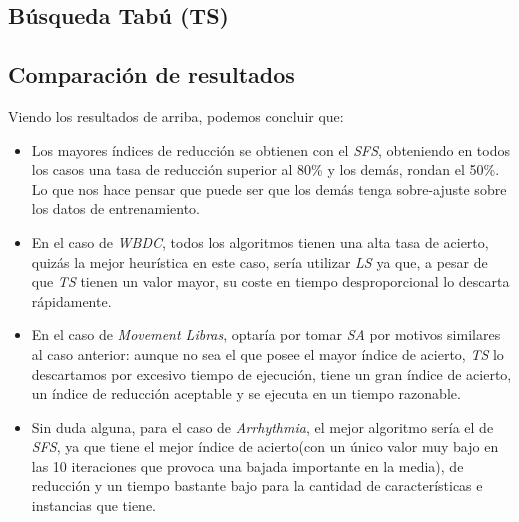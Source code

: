 \documentclass[a4paper, 11pt]{article}
\begin{document}
		\subsection{Búsqueda Tabú (\textbf{TS})}
			
			
			
			
		\subsection{Comparación de resultados}
			
			
			Viendo los resultados de arriba, podemos concluir que:
			\begin{itemize}
				\item Los mayores índices de reducción se obtienen con el \textit{SFS}, obteniendo en
				todos los casos una tasa de reducción superior al 80\% y los demás, rondan el 50\%.
				Lo que nos hace pensar que puede ser que los demás tenga sobre-ajuste sobre los datos
				de entrenamiento.
				
				\item En el caso de \textit{WBDC}, todos los algoritmos tienen una alta tasa de acierto,
				quizás la mejor heurística en este caso, sería utilizar \textit{LS} ya que, a pesar
				de que \textit{TS} tienen un valor mayor, su coste en tiempo desproporcional lo descarta
				rápidamente.
				
				\item En el caso de \textit{Movement Libras}, optaría por tomar \textit{SA} por motivos
				similares al caso anterior: aunque no sea el que posee el mayor índice de acierto,
				\textit{TS} lo descartamos por excesivo tiempo de ejecución, tiene un gran índice de
				acierto, un índice de reducción aceptable y se ejecuta en un tiempo razonable.

				\item Sin duda alguna, para el caso de \textit{Arrhythmia}, el mejor algoritmo sería
				el de \textit{SFS}, ya que tiene el mejor índice de acierto(con un único valor muy
				bajo en las 10 iteraciones que provoca una bajada importante en la media), de reducción
				y un tiempo bastante bajo para la cantidad de características e instancias que tiene.
			\end{itemize}
		
	\newpage
	
\end{document}
